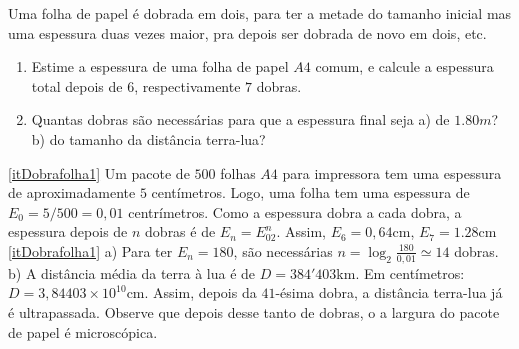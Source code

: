 \begin{exo}
Uma folha de papel é dobrada em dois, para ter a metade do tamanho inicial mas
uma espessura duas vezes maior, pra depois ser dobrada de novo em dois, etc. 
\begin{enumerate}
 \item\label{itDobrafolha1}
Estime a espessura de uma folha de papel $A4$ comum, e calcule a espessura total
depois de $6$, respectivamente  $7$ dobras.
\item\label{itDobrafolha2} Quantas dobras são necessárias para que a espessura
final seja 
a) de $1.80m$?
b) do tamanho da distância terra-lua? 
\end{enumerate}
\begin{sol}
\eqref{itDobrafolha1} 
Um pacote de $500$ folhas $A4$ para impressora tem uma espessura de
aproximadamente $5$ centímetros. Logo, uma folha tem uma espessura de
$E_0=5/500=0,01$ centrímetros. Como a espessura dobra a cada dobra, a espessura
depois de $n$ dobras é de $E_n=E_02^n$. Assim, $E_6=0,64$cm, $E_7=1.28$cm
\eqref{itDobrafolha1} a) Para ter $E_n=180$, são necessárias
$n=\log_{2}\frac{180}{0,01}\simeq 14$ dobras.
b) A distância média da terra à lua é de $D=384'403$km. Em centímetros:
$D=3,84403\times 10^{10}$cm. Assim, depois da $41$-ésima dobra, a distância
terra-lua já é ultrapassada.
Observe que depois desse tanto de dobras, o a largura do pacote de papel é
microscópica.
\end{sol}
\end{exo}

